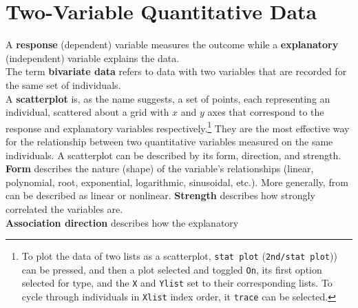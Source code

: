 \documentclass[../AP_Statistics.tex]{subfiles}
\begin{document}
	\chapter{Two-Variable Quantitative Data}
		A \textbf{response} (dependent) variable measures the outcome while a \textbf{explanatory} (independent) variable explains the data. \\
		The term \textbf{bivariate data} refers to data with two variables that are recorded for the same set of individuals. \\
		A \textbf{scatterplot} is, as the name suggests, a set of points, each representing an individual, scattered about a grid with $x$ and $y$ axes that correspond to the response and explanatory variables respectively.\footnote{To plot the data of two lists as a scatterplot, \texttt{stat plot} (\texttt{2nd/stat plot})) can be pressed, and then a plot selected and toggled \texttt{On}, its first option selected for type, and the \texttt{X} and \texttt{Ylist} set to their corresponding lists. To cycle through individuals in \texttt{Xlist} index order, it \texttt{trace} can be selected.} They are the most effective way for the relationship between two quantitative variables measured on the same individuals.
		A scatterplot can be described by its form, direction, and strength. \\
		\textbf{Form} describes the nature (shape) of the variable's relationships (linear, polynomial, root, exponential, logarithmic, sinusoidal, etc.). More generally, from can be described as linear or nonlinear.
		\textbf{Strength} describes how strongly correlated the variables are. \\
		\textbf{Association direction} describes how the explanatory
\end{document}
